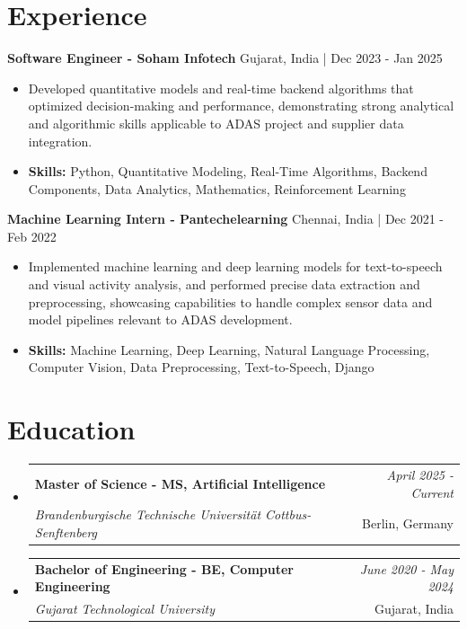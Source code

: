 \documentclass[a4paper,11pt]{article}
\makeatletter
\newcommand{\resumeSubheading}[4]{
\vspace{0.5mm}\item
    \begin{tabular*}{\linewidth}[t]{l@{\extracolsep{\fill}}r}
        \textbf{#1} & \textit{\footnotesize{#4}} \\
        \textit{\footnotesize{#3}} &  \footnotesize{#2}\\
    \end{tabular*}
    \vspace{-2.4mm}
}
\makeatother
\begin{document}
\section{\textbf{Experience}}


\vspace{1mm}
  \textbf{Software Engineer - Soham Infotech} \hfill Gujarat, India | Dec 2023 - Jan 2025
\vspace{-1.5mm} %
\begin{itemize}
  \item Developed quantitative models and real-time backend algorithms that optimized decision-making and performance, demonstrating strong analytical and algorithmic skills applicable to ADAS project and supplier data integration.

\vspace{-2mm}
  \item \textbf{Skills:} Python, Quantitative Modeling, Real-Time Algorithms, Backend Components, Data Analytics, Mathematics, Reinforcement Learning
\end{itemize}

\vspace{1mm}
  \textbf{Machine Learning Intern - Pantechelearning} \hfill Chennai, India | Dec 2021 - Feb 2022
\vspace{-1.5mm} %
\begin{itemize}
  \item Implemented machine learning and deep learning models for text-to-speech and visual activity analysis, and performed precise data extraction and preprocessing, showcasing capabilities to handle complex sensor data and model pipelines relevant to ADAS development.
\vspace{-2mm}
  \item \textbf{Skills:} Machine Learning, Deep Learning, Natural Language Processing, Computer Vision, Data Preprocessing, Text-to-Speech, Django
\end{itemize}\section{\textbf{Education}}
\vspace{-0.4mm}

\begin{itemize}[leftmargin=0.15in, label={}]
\resumeSubheading
{Master of Science - MS, Artificial Intelligence }{Berlin, Germany}
{Brandenburgische Technische Universität Cottbus-Senftenberg  }{April 2025 - Current}

\vspace{1.0mm} %
\resumeSubheading
{Bachelor of Engineering - BE, Computer Engineering  }{Gujarat, India}
{Gujarat Technological University }{June 2020 - May 2024}

\end{itemize}
\end{document}
